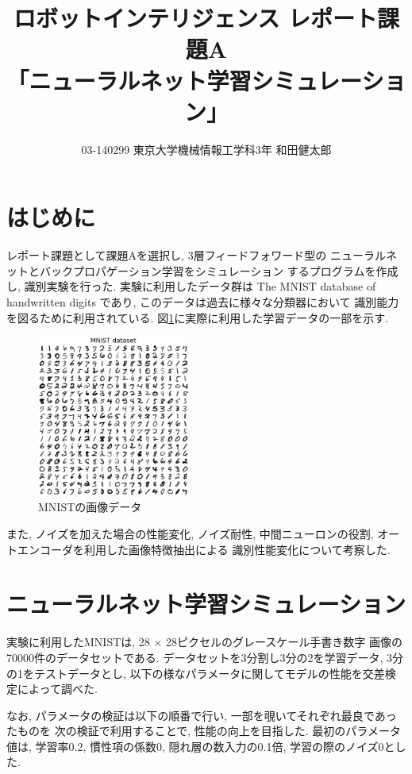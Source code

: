 \documentclass[10pt,a4paper,twocolumn]{jarticle}
\title{ロボットインテリジェンス レポート課題A \\
      「ニューラルネット学習シミュレーション」}
\author{03-140299 東京大学機械情報工学科3年 和田健太郎}
\begin{document}
\maketitle

\section{はじめに}
レポート課題として課題Aを選択し, 3層フィードフォワード型の
ニューラルネットとバックプロパゲーション学習をシミュレーション
するプログラムを作成し, 識別実験を行った. 
実験に利用したデータ群は
The MNIST database of handwritten digits
であり, このデータは過去に様々な分類器において
識別能力を図るために利用されている. \cite{mnist}
図\ref{fig:plot-mnist}に実際に利用した学習データの一部を示す. 

\begin{figure}[htbp]
  \centering
  \includegraphics[width=0.45\textwidth]{assets/img/tiled_mnist_nl0.0.eps}
  \caption{MNISTの画像データ}
  \label{fig:plot-mnist}
\end{figure}

また, ノイズを加えた場合の性能変化, ノイズ耐性, 
中間ニューロンの役割, オートエンコーダを利用した画像特徴抽出による
識別性能変化について考察した. 

\section{ニューラルネット学習シミュレーション}
実験に利用したMNISTは, 28 × 28ピクセルのグレースケール手書き数字
画像の70000件のデータセットである. 
データセットを3分割し3分の2を学習データ, 3分の1をテストデータとし, 
以下の様なパラメータに関してモデルの性能を交差検定によって調べた. 

なお, パラメータの検証は以下の順番で行い, 一部を覗いてそれぞれ最良であったものを
次の検証で利用することで, 性能の向上を目指した. 
最初のパラメータ値は, 学習率0.2, 慣性項の係数0, 
隠れ層の数入力の0.1倍, 学習の際のノイズ0とした. 
\end{document}
